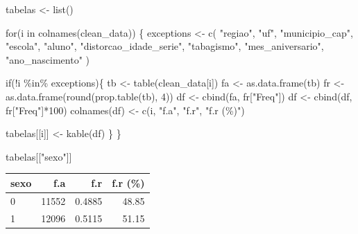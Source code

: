 \documentclass[
]{article}
\newenvironment{Shaded}{\begin{snugshade}}{\end{snugshade}}
\newcommand{\ControlFlowTok}[1]{\textcolor[rgb]{0.00,0.23,0.31}{#1}}
\newcommand{\DecValTok}[1]{\textcolor[rgb]{0.68,0.00,0.00}{#1}}
\newcommand{\FunctionTok}[1]{\textcolor[rgb]{0.28,0.35,0.67}{#1}}
\newcommand{\NormalTok}[1]{\textcolor[rgb]{0.00,0.23,0.31}{#1}}
\newcommand{\OtherTok}[1]{\textcolor[rgb]{0.00,0.23,0.31}{#1}}
\newcommand{\SpecialCharTok}[1]{\textcolor[rgb]{0.37,0.37,0.37}{#1}}
\newcommand{\StringTok}[1]{\textcolor[rgb]{0.13,0.47,0.30}{#1}}
\begin{document}
\begin{Shaded}
\begin{Highlighting}[]
\NormalTok{tabelas }\OtherTok{\textless{}{-}} \FunctionTok{list}\NormalTok{()}

\ControlFlowTok{for}\NormalTok{(i }\ControlFlowTok{in} \FunctionTok{colnames}\NormalTok{(clean\_data)) \{}
\NormalTok{  exceptions }\OtherTok{\textless{}{-}} \FunctionTok{c}\NormalTok{(}
    \StringTok{"regiao"}\NormalTok{,}
    \StringTok{"uf"}\NormalTok{,}
    \StringTok{"municipio\_cap"}\NormalTok{,}
    \StringTok{"escola"}\NormalTok{,}
    \StringTok{"aluno"}\NormalTok{,}
    \StringTok{"distorcao\_idade\_serie"}\NormalTok{,}
    \StringTok{"tabagismo"}\NormalTok{,}
    \StringTok{"mes\_aniversario"}\NormalTok{,}
    \StringTok{"ano\_nascimento"}
\NormalTok{  )}
  
  \ControlFlowTok{if}\NormalTok{(}\SpecialCharTok{!}\NormalTok{i }\SpecialCharTok{\%in\%}\NormalTok{ exceptions)\{}
\NormalTok{    tb }\OtherTok{\textless{}{-}} \FunctionTok{table}\NormalTok{(clean\_data[i])}
\NormalTok{    fa }\OtherTok{\textless{}{-}} \FunctionTok{as.data.frame}\NormalTok{(tb)}
\NormalTok{    fr }\OtherTok{\textless{}{-}} \FunctionTok{as.data.frame}\NormalTok{(}\FunctionTok{round}\NormalTok{(}\FunctionTok{prop.table}\NormalTok{(tb), }\DecValTok{4}\NormalTok{))}
\NormalTok{    df }\OtherTok{\textless{}{-}} \FunctionTok{cbind}\NormalTok{(fa, fr[}\StringTok{"Freq"}\NormalTok{])}
\NormalTok{    df }\OtherTok{\textless{}{-}} \FunctionTok{cbind}\NormalTok{(df, fr[}\StringTok{"Freq"}\NormalTok{]}\SpecialCharTok{*}\DecValTok{100}\NormalTok{)}
    \FunctionTok{colnames}\NormalTok{(df) }\OtherTok{\textless{}{-}} \FunctionTok{c}\NormalTok{(i, }\StringTok{"f.a"}\NormalTok{, }\StringTok{"f.r"}\NormalTok{, }\StringTok{"f.r (\%)"}\NormalTok{)}

\NormalTok{    tabelas[[i]] }\OtherTok{\textless{}{-}} \FunctionTok{kable}\NormalTok{(df)}
\NormalTok{  \}}
\NormalTok{\}}
\end{Highlighting}
\end{Shaded}

\begin{Shaded}
\begin{Highlighting}[]
\NormalTok{tabelas[[}\StringTok{"sexo"}\NormalTok{]]}
\end{Highlighting}
\end{Shaded}

\begin{longtable}[]{@{}lrrr@{}}
\toprule()
sexo & f.a & f.r & f.r (\%) \\
\midrule()
\endhead
0 & 11552 & 0.4885 & 48.85 \\
1 & 12096 & 0.5115 & 51.15 \\
\bottomrule()
\end{longtable}
\end{document}
